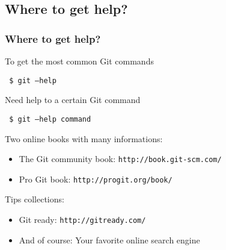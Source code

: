 \documentclass{beamer}
\begin{document}
\subsection{Where to get help?}
\begin{frame}
    \frametitle{Where to get help?}
    To get the most common Git commands\medskip
    
    {\tt\ \$ git --help}\medskip
   
    \pause
    Need help to a certain Git command\medskip
    
    {\tt\ \$ git --help command}\medskip
    
    \pause
    Two online books with many informations:
    \begin{itemize}
      \item The Git community book: \texttt{http://book.git-scm.com/}
      \item Pro Git book: \texttt{http://progit.org/book/}
    \end{itemize}
    Tips collections:
    \begin{itemize}
      \item Git ready: \texttt{http://gitready.com/}
      \item And of course: Your favorite online search engine
    \end{itemize}
\end{frame}
\end{document}
